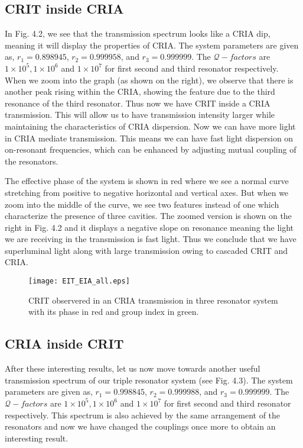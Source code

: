 \subsection{CRIT inside CRIA}
In Fig. 4.2, we see that the transmission spectrum looks like a CRIA dip, meaning it will display the properties of CRIA. The system parameters are given as, $r_{1} = 0.898945$, $r_{2} = 0.999958$, and $r_{3} = 0.999999$. The $\mathcal{Q}-factors$ are $1\times10^{5}, 1\times10^{6}$ and $1\times10^{7}$ for first second and third resonator respectively. When we zoom into the graph (as shown on the right), we observe that there is another peak rising within the CRIA, showing the feature due to the third resonance of the third resonator. Thus now we have CRIT inside a CRIA transmission. This will allow us to have transmission intensity larger while maintaining the characteristics of CRIA dispersion. Now we can have more light in CRIA mediate transmission. This means we can have fast light dispersion on on-resonant frequencies, which can be enhanced by adjusting mutual coupling of the resonators.

The effective phase of the system is shown in red where we see a normal curve stretching from positive to negative horizontal and vertical axes. But when we zoom into the middle of the curve, we see two features instead of one which characterize the presence of three cavities. The zoomed version is shown on the right in Fig. 4.2 and it displays a negative slope on resonance meaning the light we are receiving in the transmission is fast light. Thus we conclude that we have superluminal light along with large transmission owing to cascaded CRIT and CRIA.

\begin{figure}[t]
\centering
\texttt{[image: EIT\_EIA\_all.eps]}
\caption{CRIT observered in an CRIA transmission in three resonator system with its phase in red and group index in green.}
\end{figure}

\newpage
\subsection{CRIA inside CRIT}

After these interesting results, let us now move towards another useful transmission spectrum of our triple resonator system (see Fig. 4.3). The system parameters are given as, $r_{1} = 0.998845$, $r_{2} = 0.999988$, and $r_{3} = 0.999999$. The $\mathcal{Q}-factors$ are $1\times10^{5}, 1\times10^{6}$ and $1\times10^{7}$ for first second and third resonator respectively. This spectrum is also achieved by the same arrangement of the resonators and now we have changed the couplings once more to obtain an interesting result. 

